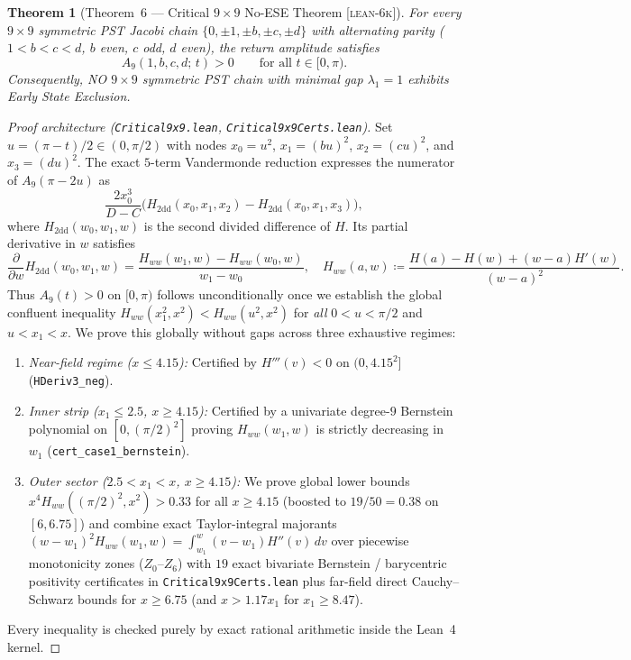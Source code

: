 \documentclass[11pt,reqno]{amsart}
\newtheorem{theorem}{Theorem}[section]
\theoremstyle{definition}
\newcommand{\taglean}{\textsc{[lean-6k]}}
\newcommand{\id}[1]{\textnormal{\texttt{\small #1}}}
\newcommand{\idb}[1]{\textnormal{\texttt{\footnotesize #1}}}
\begin{document}
\begin{theorem}[Theorem~6 --- Critical $9\times 9$ No-ESE Theorem \taglean{}]
\label{thm:9x9}
For \emph{every} $9\times 9$ symmetric PST Jacobi chain $\{0,\pm 1,\pm b,\pm c,\pm d\}$ with alternating parity ($1<b<c<d$, $b$ even, $c$ odd, $d$ even), the return amplitude satisfies
\[
A_9(1,b,c,d;\,t) > 0 \qquad \text{for all } t\in[0,\pi).
\]
Consequently, NO $9\times 9$ symmetric PST chain with minimal gap $\lambda_1=1$ exhibits Early State Exclusion.
\end{theorem}

\begin{proof}[Proof architecture (\idb{Critical9x9.lean}, \idb{Critical9x9Certs.lean})]
Set $u=(\pi-t)/2\in(0,\pi/2)$ with nodes $x_0=u^2$, $x_1=(bu)^2$, $x_2=(cu)^2$, and $x_3=(du)^2$. The exact $5$-term Vandermonde reduction expresses the numerator of $A_9(\pi-2u)$ as
\[
\frac{2x_0^3}{D-C}\Big(H_{\mathrm{2dd}}(x_0,x_1,x_2) - H_{\mathrm{2dd}}(x_0,x_1,x_3)\Big),
\]
where $H_{\mathrm{2dd}}(w_0,w_1,w)$ is the second divided difference of $H$. Its partial derivative in $w$ satisfies
\begin{equation*}
\frac{\partial}{\partial w} H_{\mathrm{2dd}}(w_0,w_1,w) = \frac{H_{ww}(w_1,w) - H_{ww}(w_0,w)}{w_1-w_0},
\quad
H_{ww}(a,w) \coloneqq \frac{H(a)-H(w)+(w-a)H'(w)}{(w-a)^2}.
\end{equation*}
Thus $A_9(t)>0$ on $[0,\pi)$ follows unconditionally once we establish the global confluent inequality $H_{ww}(x_1^2,x^2) < H_{ww}(u^2,x^2)$ for \emph{all} $0<u<\pi/2$ and $u<x_1<x$. We prove this globally without gaps across three exhaustive regimes:
\begin{enumerate}
\item \emph{Near-field regime ($x\le 4.15$):} Certified by $H'''(v)<0$ on $(0,4.15^2]$ (\id{HDeriv3\_neg}).
\item \emph{Inner strip ($x_1\le 2.5$, $x\ge 4.15$):} Certified by a univariate degree-$9$ Bernstein polynomial on $[0,(\pi/2)^2]$ proving $H_{ww}(w_1,w)$ is strictly decreasing in $w_1$ (\id{cert\_case1\_bernstein}).
\item \emph{Outer sector ($2.5<x_1<x$, $x\ge 4.15$):} We prove global lower bounds $x^4 H_{ww}((\pi/2)^2,x^2) > 0.33$ for all $x\ge 4.15$ (boosted to $19/50=0.38$ on $[6,6.75]$) and combine exact Taylor-integral majorants $(w-w_1)^2 H_{ww}(w_1,w)=\int_{w_1}^w (v-w_1)H''(v)\,dv$ over piecewise monotonicity zones ($Z_0$--$Z_6$) with $19$ exact bivariate Bernstein / barycentric positivity certificates in \id{Critical9x9Certs.lean} plus far-field direct Cauchy--Schwarz bounds for $x\ge 6.75$ (and $x>1.17x_1$ for $x_1\ge 8.47$).
\end{enumerate}
Every inequality is checked purely by exact rational arithmetic inside the Lean~4 kernel.
\end{proof}
\end{document}
